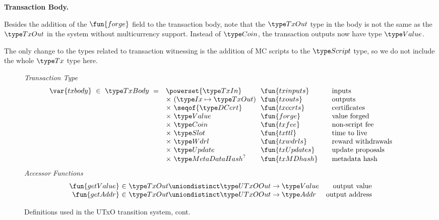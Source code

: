 \textbf{Transaction Body.}

Besides the addition of the $\fun{forge}$ field to the transaction body,
note that the $\TxOut$ type in the body is not the same as
the $\TxOut$ in the system without multicurrency support. Instead of
$\Coin$, the transaction outputs now have type $\Value$.

The only change to the types related to transaction witnessing is the addition
of MC scripts to the $\Script$ type, so we do not include the whole $\Tx$ type here.

\begin{figure*}[htb]
  \emph{Transaction Type}
  \begin{equation*}
    \begin{array}{r@{~~}l@{~~}l@{\qquad}l}
      \var{txbody} ~\in~ \TxBody ~=~
      & \powerset{\TxIn} & \fun{txinputs}& \text{inputs}\\
      &\times ~(\Ix \mapsto \TxOut) & \fun{txouts}& \text{outputs}\\
      & \times~ \seqof{\DCert} & \fun{txcerts}& \text{certificates}\\
       & \times ~\Value  & \fun{forge} &\text{value forged}\\
       & \times ~\Coin & \fun{txfee} &\text{non-script fee}\\
       & \times ~\Slot & \fun{txttl} & \text{time to live}\\
       & \times~ \Wdrl  & \fun{txwdrls} &\text{reward withdrawals}\\
       & \times ~\Update  & \fun{txUpdates} & \text{update proposals}\\
       & \times ~\MetaDataHash^? & \fun{txMDhash} & \text{metadata hash}\\
    \end{array}
  \end{equation*}
  \emph{Accessor Functions}
  \begin{equation*}
    \begin{array}{r@{~\in~}lr}
      \fun{getValue} & \TxOut \uniondistinct \UTxOOut \to \Value & \text{output value} \\
      \fun{getAddr} & \TxOut \uniondistinct \UTxOOut \to \Addr & \text{output address} \\
    \end{array}
  \end{equation*}
  \caption{Definitions used in the UTxO transition system, cont.}
  \label{fig:defs:utxo-shelley-2}
\end{figure*}

